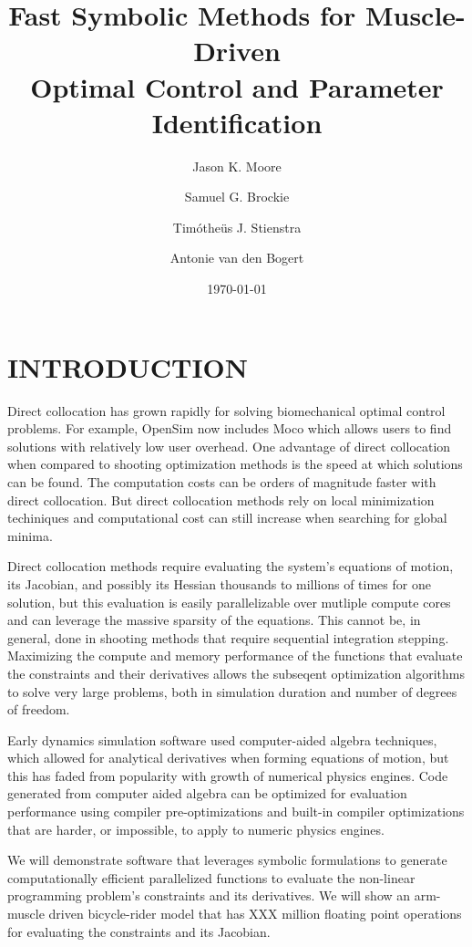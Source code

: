 \documentclass[11pt,twocolumn]{article}
\title{Fast Symbolic Methods for Muscle-Driven\\Optimal Control and Parameter
Identification}
\author{Jason K. Moore \and Samuel G. Brockie \and Timótheüs J. Stienstra \and Antonie van den Bogert}
\date{\today}
\begin{document}
\maketitle
\section*{INTRODUCTION}
%
Direct collocation has grown rapidly for solving biomechanical optimal control
problems. For example, OpenSim now includes Moco which allows users to find
solutions with relatively low user overhead. One advantage of direct
collocation when compared to shooting optimization methods is the speed at
which solutions can be found. The computation costs can be orders of
magnitude faster with direct collocation. But direct collocation methods
rely on local minimization techiniques and computational cost can still increase when
searching for global minima.

Direct collocation methods require evaluating the system's equations of motion,
its Jacobian, and possibly its Hessian thousands to millions of times for one
solution, but this evaluation is easily parallelizable over mutliple compute
cores and can leverage the massive sparsity of the equations. This cannot be,
in general, done in shooting methods that require sequential integration
stepping. Maximizing the compute and memory performance of the functions that
evaluate the constraints and their derivatives allows the subseqent
optimization algorithms to solve very large problems, both in simulation
duration and number of degrees of freedom.

Early dynamics simulation software used computer-aided algebra techniques,
which allowed for analytical derivatives when forming equations of motion, but
this has faded from popularity with growth of numerical physics engines. Code
generated from computer aided algebra can be optimized for evaluation
performance using compiler pre-optimizations and built-in compiler
optimizations that are harder, or impossible, to apply to numeric physics
engines.

We will demonstrate software that leverages symbolic formulations to generate
computationally efficient parallelized functions to evaluate the non-linear
programming problem's constraints and its derivatives. We will show an
arm-muscle driven bicycle-rider model that has XXX million floating point
operations for evaluating the constraints and its Jacobian.
\end{document}
